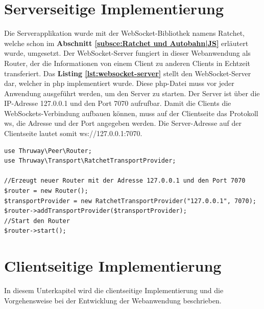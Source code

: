 \section{Serverseitige Implementierung}
\label{sec:Serverseitige Implementierung}
Die Serverapplikation wurde mit der WebSocket-Bibliothek namens Ratchet, welche schon im \textbf{Abschnitt \ref{subsce:Ratchet und Autobahn|JS}} erläutert wurde, umgesetzt. Der WebSocket-Server fungiert in dieser Webanwendung als Router, der die Informationen von einem Client zu anderen Clients in Echtzeit transferiert. Das \textbf{Listing \ref{lst:websocket-server}} stellt den WebSocket-Server dar, welcher in php implementiert wurde. Diese php-Datei muss vor jeder Anwendung ausgeführt werden, um den Server zu starten. Der Server ist über die IP-Adresse 127.0.0.1 und den Port 7070 aufrufbar. Damit die Clients die WebSockets-Verbindung aufbauen können, muss auf der Clientseite das Protokoll \glqq ws\grqq{}, die Adresse und der Port angegeben werden. Die Server-Adresse auf der Clientseite lautet somit \glqq ws://127.0.0.1:7070\grqq{}.\bigskip

\begin{lstlisting}[caption={WebSocket-Server}, label=lst:websocket-server, captionpos=b]
use Thruway\Peer\Router;
use Thruway\Transport\RatchetTransportProvider;

//Erzeugt neuer Router mit der Adresse 127.0.0.1 und den Port 7070
$router = new Router();
$transportProvider = new RatchetTransportProvider("127.0.0.1", 7070);
$router->addTransportProvider($transportProvider);
//Start den Router
$router->start();
\end{lstlisting}

\newpage
\section{Clientseitige Implementierung}
\label{sec:Clientseitige Implementierung}
In diesem Unterkapitel wird die clientseitige Implementierung und die Vorgehensweise bei der Entwicklung der Webanwendung beschrieben.\bigskip

